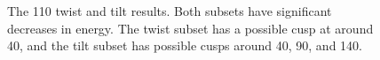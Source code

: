 \documentclass[twoside,senior]{BYUPhys}
\begin{document}
\begin{figure}[ht!]
 \centering
 
 \quad
 \caption[Results for the \textlangle{}110\textrangle{} fitting.]{\label{fig:110} The \textlangle{}110\textrangle{} twist \protect{} and tilt \protect{} results.  Both subsets have significant decreases in energy.  The twist subset has a possible cusp at around 40\textdegree{}, and the tilt subset has possible cusps around 40\textdegree{}, 90\textdegree{}, and 140\textdegree{}.}
 
\end{figure}
\end{document}
